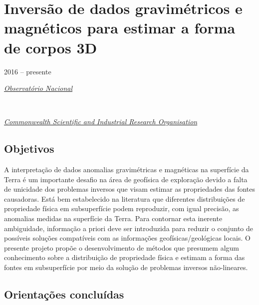 \section{Inversão de dados gravimétricos e magnéticos para estimar a forma de corpos 3D} 
\label{sec:projeto-bolachinhas}

2016 -- presente
\vspace{0.3\baselineskip}\\
\noindent\parbox{0.03\textwidth}{\vspace{-0.2\baselineskip}\faUniversity} \href{https://www.gov.br/observatorio/pt-br}{\textsl{Observatório Nacional}}
\parbox{0.03\textwidth}{\vspace{-0.2\baselineskip} \hfill {}} \\
\noindent\parbox{0.03\textwidth}{\vspace{-0.2\baselineskip}\faUniversity}
\href{https://www.csiro.au/}{\textsl{Commonwealth Scientific and Industrial Research Organisation}}
\parbox{0.04\textwidth}{\vspace{-0.2\baselineskip} \hfill {}}

\subsection*{Objetivos}

A interpretação de dados anomalias gravimétricas e magnéticas na superfície da Terra é um
importante desafio na área de geofísica de exploração devido a falta de unicidade dos
problemas inversos que visam estimar as propriedades das fontes causadoras. Está bem
estabelecido na literatura que diferentes distribuições de propriedade física em
subsuperfície podem reproduzir, com igual precisão, as anomalias medidas na superfície 
da Terra. Para contornar esta inerente ambiguidade, informação a priori deve ser introduzida
para reduzir o conjunto de possíveis soluções compatíveis com as informações
geofísicas/geológicas locais. O presente projeto propõe o desenvolvimento de métodos que
presumem algum conhecimento sobre a distribuição de propriedade física e estimam a forma das
fontes em subsuperfície por meio da solução de problemas inversos não-lineares. 

\subsection*{Orientações concluídas}

